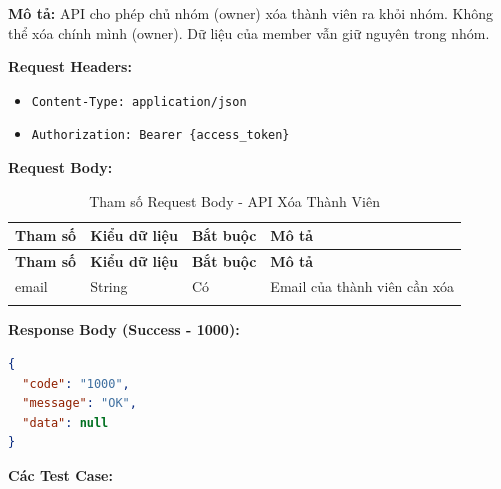 \textbf{Mô tả:} API cho phép chủ nhóm (owner) xóa thành viên ra khỏi nhóm. Không thể xóa chính mình (owner). Dữ liệu của member vẫn giữ nguyên trong nhóm.

\textbf{Request Headers:}
\begin{itemize}
    \item \texttt{Content-Type: application/json}
    \item \texttt{Authorization: Bearer \{access\_token\}}
\end{itemize}

\textbf{Request Body:}

\small
\begin{longtable}{|>{\raggedright\arraybackslash}p{3.5cm}|>{\raggedright\arraybackslash}p{2.5cm}|>{\raggedright\arraybackslash}p{2cm}|>{\raggedright\arraybackslash}p{5.5cm}|}
\hline
\textbf{Tham số} & \textbf{Kiểu dữ liệu} & \textbf{Bắt buộc} & \textbf{Mô tả} \\
\hline
\endfirsthead
\hline
\textbf{Tham số} & \textbf{Kiểu dữ liệu} & \textbf{Bắt buộc} & \textbf{Mô tả} \\
\hline
\endhead
email & String & Có & Email của thành viên cần xóa \\
\hline
\caption{Tham số Request Body - API Xóa Thành Viên}
\end{longtable}

\textbf{Response Body (Success - 1000):}

\begin{lstlisting}[language=json, caption=Response thanh cong API 6.4]
{
  "code": "1000",
  "message": "OK",
  "data": null
}
\end{lstlisting}

\textbf{Các Test Case:}

